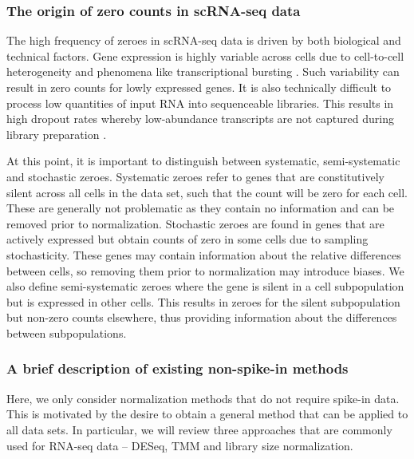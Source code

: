 \documentclass{bmcart}
\begin{document}
\subsubsection*{The origin of zero counts in scRNA-seq data}
The high frequency of zeroes in scRNA-seq data is driven by both biological and technical factors.
Gene expression is highly variable across cells due to cell-to-cell heterogeneity and phenomena like transcriptional bursting \cite{marinov2014singlecell}.
Such variability can result in zero counts for lowly expressed genes.
It is also technically difficult to process low quantities of input RNA into sequenceable libraries.
This results in high dropout rates whereby low-abundance transcripts are not captured during library preparation \cite{brennecke2013accounting}.

At this point, it is important to distinguish between systematic, semi-systematic and stochastic zeroes.
Systematic zeroes refer to genes that are constitutively silent across all cells in the data set, such that the count will be zero for each cell.
These are generally not problematic as they contain no information and can be removed prior to normalization.
Stochastic zeroes are found in genes that are actively expressed but obtain counts of zero in some cells due to sampling stochasticity.
These genes may contain information about the relative differences between cells, so removing them prior to normalization may introduce biases.
We also define semi-systematic zeroes where the gene is silent in a cell subpopulation but is expressed in other cells.
This results in zeroes for the silent subpopulation but non-zero counts elsewhere, thus providing information about the differences between subpopulations.


\subsubsection*{A brief description of existing non-spike-in methods}
Here, we only consider normalization methods that do not require spike-in data.
This is motivated by the desire to obtain a general method that can be applied to all data sets.
In particular, we will review three approaches that are commonly used for RNA-seq data -- DESeq, TMM and library size normalization.
\end{document}
